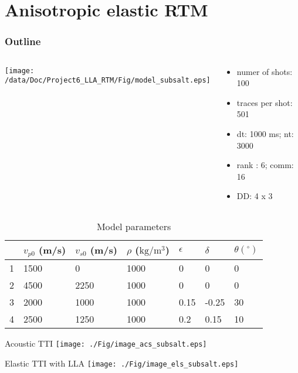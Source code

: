 \documentclass[aspectratio=169]{beamer}
\begin{document}
\section{Anisotropic elastic RTM}
\begin{frame}
\frametitle{Outline}
\tableofcontents[currentsection]
\end{frame}
\begin{frame}
\begin{columns}
  \begin{column}{0.6\textwidth}
  \texttt{[image: /data/Doc/Project6\_LLA\_RTM/Fig/model\_subsalt.eps]}
  \end{column}
  \begin{column}{0.4\textwidth}
\begin{itemize}
\item{numer of shots: 100}
\item{traces per shot: 501}
\item{dt: 1000 ms; nt: 3000}
\item{rank : 6; comm: 16}
\item{DD: 4 x 3}
\end{itemize}
  \end{column}
\end{columns}

\begin{table}[]
\centering
\begin{tabular}{|l|l|l|l|l|l|l|}
\hline
  &  $v_{p0}$ (m/s) & $v_{s0}$ (m/s) & $\rho$ ($\mathrm{kg/m^3}$) & $\epsilon$ & $\delta$  & $\theta(^\circ)$ \\ \hline
1 & 1500     & 0        & 1000        & 0    & 0     & 0    \\ \hline
2 & 4500     & 2250     & 1000        & 0    & 0     & 0    \\ \hline
3 & 2000     & 1000     & 1000        & 0.15 & -0.25 & 30   \\ \hline
4 & 2500     & 1250     & 1000        & 0.2  & 0.15  & 10   \\ \hline
\end{tabular}
\caption{Model parameters}
\end{table}
\end{frame}
\begin{frame}{Acoustic TTI}
\center
  \texttt{[image: ./Fig/image\_acs\_subsalt.eps]}
\end{frame}
\begin{frame}{Elastic TTI with LLA}
\center
  \texttt{[image: ./Fig/image\_els\_subsalt.eps]}
\end{frame}
\end{document}

